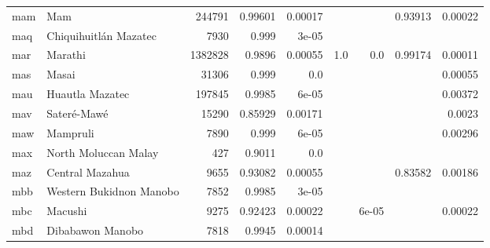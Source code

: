 \documentclass[11pt]{article}
\begin{document}
\begin{table*}[h]
{\begin{tabular}{llrrrrrrr}
mam         & Mam         & 244791         & 0.99601         & 0.00017         &          &          & 0.93913         & 0.00022         \\

maq         & Chiquihuitlán Mazatec         & 7930         & 0.999         & 3e-05         &          &          &          &          \\

mar         & Marathi         & 1382828         & 0.9896         & 0.00055         & 1.0         & 0.0         & 0.99174         & 0.00011         \\

mas         & Masai         & 31306         & 0.999         & 0.0         &          &          &          & 0.00055         \\

mau         & Huautla Mazatec         & 197845         & 0.9985         & 6e-05         &          &          &          & 0.00372         \\

mav         & Sateré-Mawé         & 15290         & 0.85929         & 0.00171         &          &          &          & 0.0023         \\

maw         & Mampruli         & 7890         & 0.999         & 6e-05         &          &          &          & 0.00296         \\

max         & North Moluccan Malay         & 427         & 0.9011         & 0.0         &          &          &          &          \\

maz         & Central Mazahua         & 9655         & 0.93082         & 0.00055         &          &          & 0.83582         & 0.00186         \\

mbb         & Western Bukidnon Manobo         & 7852         & 0.9985         & 3e-05         &          &          &          &          \\

mbc         & Macushi         & 9275         & 0.92423         & 0.00022         &          & 6e-05         &          & 0.00022         \\

mbd         & Dibabawon Manobo         & 7818         & 0.9945         & 0.00014         &          &          &          &          \\


\end{tabular}}
\end{table*}
\end{document}
